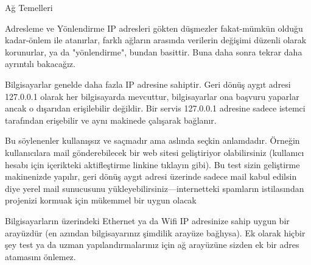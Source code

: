 \begin{section}{Ağ Temelleri}
\begin{subsection}{Adresleme ve Yönlendirme}
IP adresleri gökten düşmezler fakat-mümkün olduğu kadar-önlem ile atanırlar, farklı ağların arasında verilerin değişimi düzenli olarak korunurlar, ya da "yönlendirme", bundan basittir. Buna daha sonra tekrar daha ayrıntılı bakacağız. 

Bilgisayarlar genelde daha fazla IP adresine sahiptir. Geri dönüş aygıt adresi 127.0.0.1 olarak her bilgisayarda mevcuttur, bilgisayarlar ona başvuru yaparlar ancak o dışarıdan erişilebilir değildir. Bir servis 127.0.0.1 adresine sadece istemci tarafından erişebilir ve  aynı makinede çalışarak bağlanır.

Bu söylenenler kullanışsız ve saçmadır ama aslında seçkin anlamdadır. Örneğin kullanıcılara mail gönderebilecek bir web sitesi geliştiriyor olabilirsiniz (kullanıcı hesabı için içerikteki aktifleştirme linkine tıklayın gibi). Bu test sizin geliştirme makinenizde yapılır, geri dönüş aygıt adresi üzerinde sadece mail kabul edilsin diye yerel mail sunucusunu yükleyebilirsiniz—internetteki spamların istilasından projenizi kormuak için mükemmel bir uygun olacak

Bilgisayarların üzerindeki Ethernet ya da Wifi IP adresinize sahip uygun bir arayüzdür (en azından bilgisayarınız şimdilik arayüze bağlıysa). Ek olarak hiçbir şey test ya da uzman yapılandırmalarınız için ağ arayüzüne sizden ek bir adres atamasını önlemez.


\end{subsection}
\end{section}
